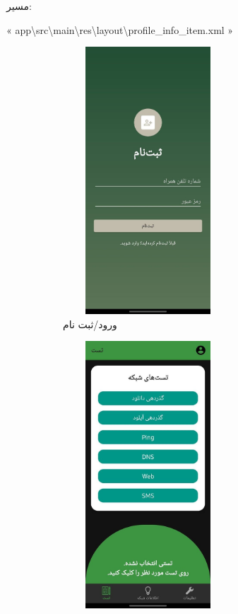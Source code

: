 \documentclass{report}
\begin{document}
\begin{note}{مسیر:}
	\begin{latin}
		« app\textbackslash src\textbackslash main\textbackslash res\textbackslash layout\textbackslash profile\_info\_item.xml »
	\end{latin}
\end{note}
\begin{figure}[ht]
	\centering
	\begin{subfigure}[b]{0.3\textwidth}\centering
		\includegraphics[width=0.7\textwidth,height=10cm,keepaspectratio]{Pic/signup}
		\caption{ورود/ثبت نام}
		\label{fig:auth}
	\end{subfigure}
	\begin{subfigure}[b]{0.3\textwidth}\centering
		\includegraphics[width=0.7\textwidth,height=10cm,keepaspectratio]{Pic/test}

\end{subfigure}
\end{figure}
\end{document}
